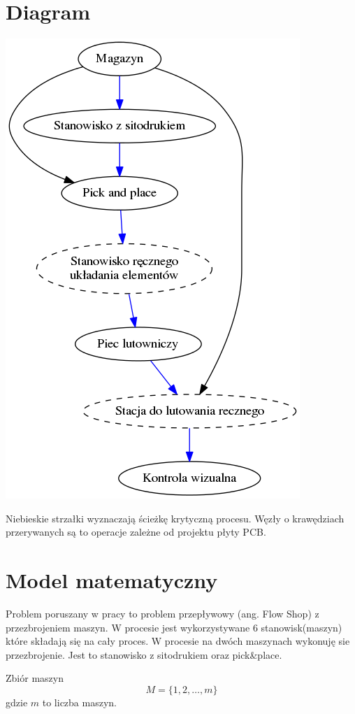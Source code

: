 \section{Diagram}
\includegraphics[scale=0.9]{chapters/graph.png}

Niebieskie strzałki wyznaczają ścieżkę krytyczną procesu.
Węzły o krawędziach przerywanych są to operacje zależne od projektu płyty PCB.



\section{Model matematyczny}
Problem poruszany w pracy to problem przepływowy (ang. Flow Shop) z przezbrojeniem maszyn.
W procesie jest wykorzystywane 6 stanowisk(maszyn) które składają się na cały proces.
W procesie na dwóch maszynach wykonuję sie przezbrojenie. Jest to stanowisko z sitodrukiem oraz pick\&place.

Zbiór maszyn
\begin{equation}
	M=\lbrace 1,2,\dots,m \rbrace
\end{equation}
gdzie $m$ to liczba maszyn.


